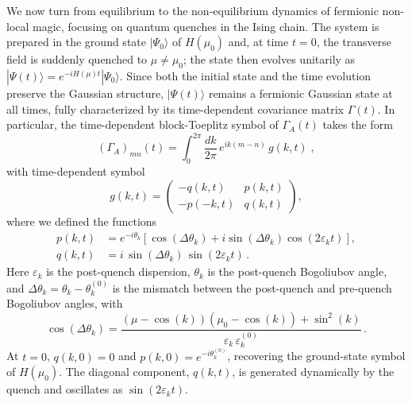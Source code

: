 \documentclass[prx,twocolumn,superscriptaddress,aps,10pt, frontmatterverbose, reprint,footinbib,longbibliography=true]{revtex4-2}
\begin{document}
We now turn from equilibrium to the non-equilibrium dynamics of fermionic non-local magic, focusing on quantum quenches in the Ising chain.
The system is prepared in the ground state $|\Psi_0\rangle$ of $H(\mu_0)$ and, at time $t=0$, the transverse field is suddenly quenched to $\mu \neq \mu_0$; the state then evolves unitarily as $|\Psi(t)\rangle = e^{-iH(\mu)t}|\Psi_0\rangle$.
Since both the initial state and the time evolution preserve the Gaussian structure, $|\Psi(t)\rangle$ remains a fermionic Gaussian state at all times, fully characterized by its time-dependent covariance matrix $\Gamma(t)$.
In particular, the time-dependent block-Toeplitz symbol of $\Gamma_A(t)$ takes the form~\cite{Calabrese2005evolution}
\begin{equation}
    (\Gamma_A)_{mn}(t) = \int_0^{2\pi}\!\frac{dk}{2\pi}\,e^{ik(m-n)}\,g(k,t)\;,\label{eq:mustang}
\end{equation}
with time-dependent symbol
\begin{equation}
    g(k,t) = \begin{pmatrix} -q(k,t) & p(k,t) \\ -p(-k,t) & q(k,t) \end{pmatrix},
    \label{eq:symbol_t}
\end{equation}
where we defined the functions
\begin{equation}
\begin{split}
    p(k,t) &= e^{-i\theta_k}\left[\cos(\Delta\theta_k) + i\sin(\Delta\theta_k)\cos (2\varepsilon_k t) \right], \\
    q(k,t) &= i\,\sin(\Delta\theta_k)\,\sin (2\varepsilon_k t)\,.
    \label{eq:pq_symbol}
\end{split}
\end{equation}
Here $\varepsilon_k $ is the post-quench dispersion, $\theta_k$ is the post-quench Bogoliubov angle, and $\Delta\theta_k = \theta_k - \theta_k^{(0)}$ is the mismatch between the post-quench and pre-quench Bogoliubov angles, with
\begin{equation}
    \cos(\Delta\theta_k) = \frac{(\mu-\cos(k))(\mu_0-\cos (k))+\sin^2 (k)}{\varepsilon_k\,\varepsilon_k^{(0)}}\,.
    \label{eq:cos_delta_theta}
\end{equation}
At $t=0$, $q(k,0) = 0$ and $p(k,0) = e^{-i\theta_k^{(0)}}$, recovering the ground-state symbol of $H(\mu_0)$.
The diagonal component, $q(k,t)$, is generated dynamically by the quench and oscillates as $\sin(2\varepsilon_k t)$.
\end{document}

